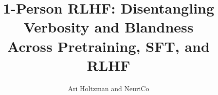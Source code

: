 \documentclass{article}
\title{1-Person RLHF: Disentangling Verbosity and Blandness\\Across Pretraining, SFT, and RLHF}
\author{Ari Holtzman and NeuriCo}
\begin{document}
\maketitle

\begin{abstract}

\end{abstract}










\end{document}
